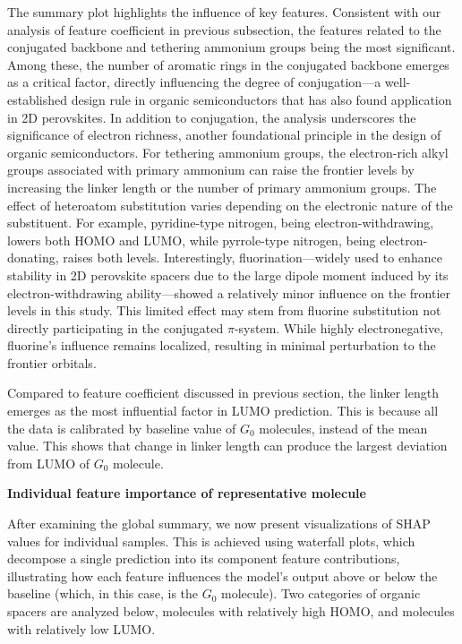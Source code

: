 The summary plot highlights the influence of key features. Consistent with our analysis of feature coefficient in previous subsection, the features related to the conjugated backbone and tethering ammonium groups being the most significant. Among these, the number of aromatic rings in the conjugated backbone emerges as a critical factor, directly influencing the degree of conjugation—a well-established design rule in organic semiconductors\cite{RN282} that has also found application in 2D perovskites\cite{RN18,RN20}. In addition to conjugation, the analysis underscores the significance of electron richness, another foundational principle in the design of organic semiconductors\cite{RN282}. For tethering ammonium groups, the electron-rich alkyl groups associated with primary ammonium can raise the frontier levels by increasing the linker length or the number of primary ammonium groups. The effect of heteroatom substitution varies depending on the electronic nature of the substituent. For example, pyridine-type nitrogen, being electron-withdrawing, lowers both HOMO and LUMO, while pyrrole-type nitrogen, being electron-donating, raises both levels. Interestingly, fluorination—widely used to enhance stability in 2D perovskite spacers due to the large dipole moment induced by its electron-withdrawing ability\cite{RN84,RN392}—showed a relatively minor influence on the frontier levels in this study. This limited effect may stem from fluorine substitution not directly participating in the conjugated $\pi$-system. While highly electronegative, fluorine’s influence remains localized, resulting in minimal perturbation to the frontier orbitals. 

Compared to feature coefficient discussed in previous section, the linker length emerges as the most influential factor in LUMO prediction. This is because all the data is calibrated by baseline value of $G_0$ molecules, instead of the mean value. This shows that change in linker length can produce the largest deviation from LUMO of $G_0$ molecule.

\textbf{Individual feature importance of representative molecule}

After examining the global summary, we now present visualizations of SHAP values for individual samples. This is achieved using waterfall plots, which decompose a single prediction into its component feature contributions, illustrating how each feature influences the model’s output above or below the baseline (which, in this case, is the $G_0$ molecule). Two categories of organic spacers are analyzed below, molecules with relatively high HOMO, and molecules with relatively low LUMO.

